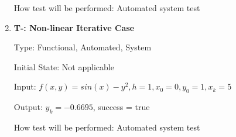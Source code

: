 \documentclass[12pt, titlepage]{article}
\newcounter{tnum} %
\begin{document}
\begin{enumerate}
How test will be performed: Automated system test

\item{\textbf{T-\thetnum \label{t-euler_nonlineariterative}: Non-linear Iterative Case}}

Type: Functional, Automated, System %
					
Initial State: Not applicable
					
Input: $f(x, y) = sin(x) - y^2, h = 1, x_0 = 0, y_0 = 1, x_k = 5$
					
Output: $y_k = -0.6695$, success = true
					
How test will be performed: Automated system test

\end{enumerate}
\end{document}
